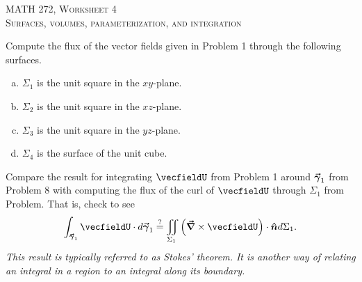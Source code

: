 \documentclass[12pt]{article} %
\begin{document}
\begin{center}
   \textsc{\large MATH 272, Worksheet 4}\\
   \textsc{Surfaces, volumes, parameterization, and integration}
\end{center}
\vspace{.5cm}

\begin{problem}
Compute the flux of the vector fields given in Problem 1 through the following surfaces.
\begin{multicols}{2}
\begin{enumerate}[(a)]
    \item $\Sigma_1$ is the unit square in the $xy$-plane.  
    \item $\Sigma_2$ is the unit square in the $xz$-plane.
    \item $\Sigma_3$ is the unit square in the $yz$-plane.
    \item $\Sigma_4$ is the surface of the unit cube.
\end{enumerate}
\end{multicols}
\end{problem}



\begin{problem}
Compare the result for integrating $\vecfieldU$ from Problem 1 around $\boldsymbol{\vec{\gamma}}_1$ from Problem 8 with computing the flux of the curl of $\vecfieldU$ through $\Sigma_1$ from Problem. That is, check to see
\[
\int_{\curvegamma_1} \vecfieldU \cdot d\curvegamma_1 \stackrel{?}{=} \iint_{\Sigma_1} \left(\grad \times \vecfieldU \right)\cdot \unitvec d\Sigma_1.
\]
\emph{This result is typically referred to as Stokes' theorem. It is another way of relating an integral in a region to an integral along its boundary.}
\end{problem}
\end{document}

